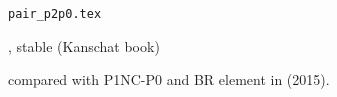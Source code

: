 \begin{flushright} {\tiny {\color{gray} \tt  pair\_p2p0.tex}} \end{flushright}

 \cite{bobf08}, \cite{cakp18} stable (Kanschat book)

compared with P1NC-P0 and BR element in \textcite{cakp15} (2015).
